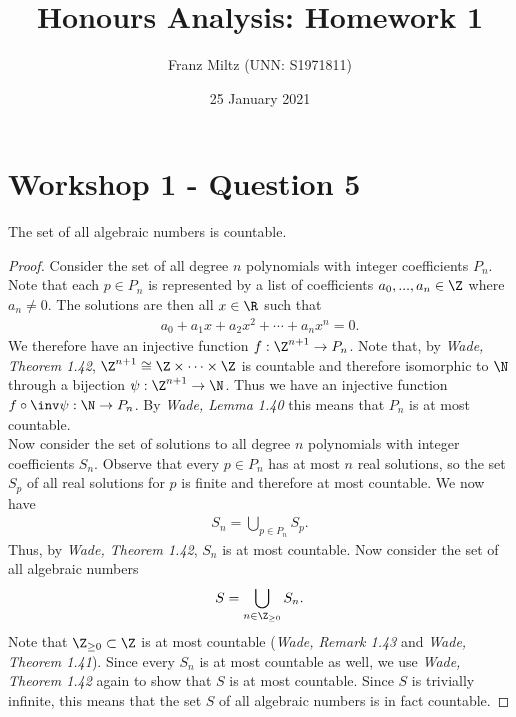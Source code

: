 \documentclass{article}
\begin{document}
\title{Honours Analysis: Homework 1}
\author{Franz Miltz (UNN: S1971811)}
\date{25 January 2021}
\maketitle

\section{Workshop 1 - Question 5}

\begin{claim}
   The set of all algebraic numbers is countable.
   \begin{proof}
      Consider the set of all degree $n$ polynomials with integer coefficients $P_n$.
      Note that each $p\in P_n$ is represented by a list of coefficients
      $a_0, ..., a_n\in\Z$ where $a_n\not=0$. The solutions are then all $x\in\R$
      such that
      \begin{align*}
         a_0 + a_1 x + a_2 x^2 + \cdots + a_n x^n = 0.
      \end{align*}
      We therefore have an injective function $f:\Z^{n+1}\to P_n$.
      Note that, by \emph{Wade, Theorem 1.42}, $\Z^{n+1}\cong \Z \times \cdots \times \Z$ is countable and therefore isomorphic to $\N$
      through a bijection $\psi:\Z^{n+1}\to\N$. Thus we have an injective
      function $f\circ\inv\psi:\N\to P_n$.
      By \emph{Wade, Lemma 1.40} this means that $P_n$ is at most countable.\\
      Now consider the set of solutions to all degree $n$ polynomials with 
      integer coefficients $S_n$. Observe that every $p\in P_n$ has at most
      $n$ real solutions, so the set $S_p$ of all real solutions for $p$ is
      finite and therefore at most countable.
      We now have 
      \begin{align*}
         S_n = \bigcup_{p\in P_n} S_p.
      \end{align*}
      Thus, by \emph{Wade, Theorem 1.42}, $S_n$ is at most countable.
      Now consider the set of all algebraic numbers
      \begin{align*}
         S = \bigcup_{n\in\Z_{\geq 0}}S_n.
      \end{align*}
      Note that $\Z_{\geq 0}\subset \Z$ is at most countable
      (\emph{Wade, Remark 1.43} and \emph{Wade, Theorem 1.41}). Since
      every $S_n$ is at most countable as well, we use \emph{Wade, Theorem 1.42}
      again to show that $S$ is at most countable.
      Since $S$ is trivially infinite, this means that the set $S$ of
      all algebraic numbers is in fact countable.
   \end{proof}
\end{claim}
\end{document}
